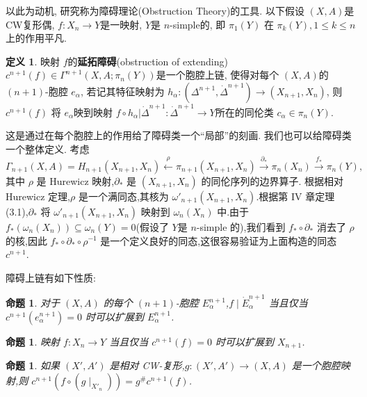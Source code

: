 \documentclass{ctexart}
\theoremstyle{plain}
\newtheorem{proposition}[theorem]{命题}
\theoremstyle{definition}
\newtheorem{definition}[theorem]{定义}
\renewcommand{\emph}{\textbf}
\begin{document}
        以此为动机, 研究称为障碍理论(Obstruction Theory)的工具. 以下假设 $(X,A)$是CW复形偶, $f:X_{n}\to Y$是一映射, $Y$是 $n$-simple的, 即 $\pi_1(Y)$ 在 $\pi_{k}(Y), 1\le k\le n$上的作用平凡.

        \begin{definition}
            映射 $f$的\emph{延拓障碍}(obstruction of extending) $c^{n+1}(f)\in \Gamma^{n+1}(X,A;\pi_{n}(Y))$是一个胞腔上链, 使得对每个 $(X,A)$的 $(n+1)$-胞腔 $e_{\alpha}$, 若记其特征映射为 $h_{\alpha}: (\Delta^{n+1},\dot{\Delta}^{n+1})\to (X_{n+1},X_{n})$, 则 $c^{n+1}(f)$ 将 $e_{\alpha}$映到映射 $f\circ h_{\alpha}|\dot{\Delta}^{n+1}: \dot{\Delta}^{n+1}\to Y$所在的同伦类 $c_{\alpha}\in \pi_{n}(Y)$.
        \end{definition}

        这是通过在每个胞腔上的作用给了障碍类一个``局部''的刻画. 我们也可以给障碍类一个整体定义. 考虑
        \[
            \Gamma_{n+1}(X, A) = H_{n+1}(X_{n+1}, X_n) \xleftarrow{\rho} \pi_{n+1}(X_{n+1}, X_n) \xrightarrow{\partial_*} \pi_n(X_n) \xrightarrow{f_*} \pi_n(Y),
        \]
        其中 $\rho$ 是 Hurewicz 映射,$\partial_*$ 是 $(X_{n+1}, X_n)$ 的同伦序列的边界算子. 根据相对 Hurewicz 定理,$\rho$ 是一个满同态,其核为 $\omega'_{n+1}(X_{n+1}, X_n)$.根据\cite{Whitehead1978}第 IV 章定理 (3.1),$\partial_*$ 将 $\omega'_{n+1}(X_{n+1}, X_n)$ 映射到 $\omega_n(X_n)$ 中.由于 $f_*(\omega_n(X_n)) \subseteq \omega_n(Y) = 0$(假设了 $Y$是 $n$-simple 的),我们看到 $f_* \circ \partial_*$ 消去了 $\rho$ 的核,因此 $f_* \circ \partial_* \circ \rho^{-1}$ 是一个定义良好的同态,这很容易验证为上面构造的同态 $c^{n+1}$.

        障碍上链有如下性质:
        \begin{proposition}
            对于 $(X, A)$ 的每个 $(n+1)$-胞腔 $E_{\alpha}^{n+1}$,$f \mid \dot{E}_{\alpha}^{n+1}$ 当且仅当 $c^{n+1}(e_{\alpha}^{n+1}) = 0$ 时可以扩展到 $E_{\alpha}^{n+1}$. 
        \end{proposition}
            
        \begin{proposition}
            \label{prop:existence of extension on skeleton}
            映射 $f : X_n \to Y$ 当且仅当 $c^{n+1}(f) = 0$ 时可以扩展到 $X_{n+1}$. 
        \end{proposition}
            
        \begin{proposition}
            如果 $(X', A')$ 是相对 CW-复形,$g : (X', A') \to (X, A)$ 是一个胞腔映射,则 $c^{n+1}(f \circ (g \mid _{X'_n})) = g^\# c^{n+1}(f)$. 
        \end{proposition}
            
\end{document}
